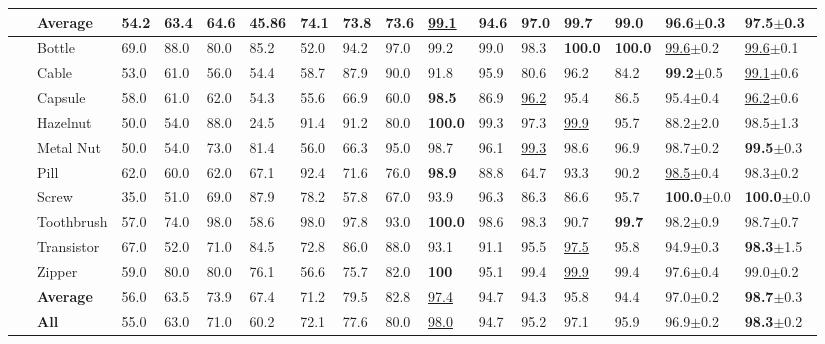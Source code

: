 \documentclass[lettersize,journal]{IEEEtran}
\begin{document}
\begin{table*}[htb]
{\begin{tabular}{C{5pt}|C{38pt}|C{23pt}C{20pt}C{21pt}C{24pt}C{24pt}C{24pt}C{23pt}C{25pt}|C{19pt}C{27pt}C{28pt}C{22pt}|C{27pt}C{28pt}}
		\hline
		~&\textbf{Average} & 54.2 & 63.4 & 64.6 & 45.86 & 74.1 & 73.8 & 73.6 & \underline{99.1} & 94.6 & 97.0 & \textbf{99.7} & 99.0 & 96.6\tiny{$\pm$0.3} & 97.5\tiny{$\pm$0.3} \\
		\hline
		&Bottle& 69.0 & 88.0 & 80.0 & 85.2 & 52.0 & 94.2 & 97.0 & 99.2 & 99.0 & 98.3 & \textbf{100.0} & \textbf{100.0} & \underline{99.6}\tiny{$\pm$0.2} & \underline{99.6}\tiny{$\pm$0.1} \\
		~&Cable& 53.0 &61.0 & 56.0 & 54.4 & 58.7 & 87.9 & 90.0 & 91.8 & 95.9 & 80.6 & 96.2 & 84.2 & \textbf{99.2}\tiny{$\pm$0.5} & \underline{99.1}\tiny{$\pm$0.6} \\
		~&Capsule& 58.0 & 61.0 & 62.0 & 54.3 & 55.6 & 66.9 & 60.0 & \textbf{98.5} & 86.9 & \underline{96.2} & 95.4 & 86.5 & 95.4\tiny{$\pm$0.4} & \underline{96.2}\tiny{$\pm$0.6} \\
		~&Hazelnut& 50.0 & 54.0 & 88.0 & 24.5 & 91.4 & 91.2 & 80.0 & \textbf{100.0} & 99.3 & 97.3 & \underline{99.9} & 95.7 & 88.2\tiny{$\pm$2.0} & 98.5\tiny{$\pm$1.3} \\
		~&Metal Nut& 50.0 & 54.0 & 73.0 & 81.4 & 56.0 & 66.3 & 95.0 & 98.7 & 96.1 & \underline{99.3} & 98.6 & 96.9 & 98.7\tiny{$\pm$0.2} & \textbf{99.5}\tiny{$\pm$0.3} \\
		~&Pill& 62.0 & 60.0 & 62.0 & 67.1 & 92.4 & 71.6 & 76.0 & \textbf{98.9} & 88.8 & 64.7 & 93.3 & 90.2 & \underline{98.5}\tiny{$\pm$0.4} & 98.3\tiny{$\pm$0.2} \\
		~&Screw& 35.0 & 51.0 & 69.0 & 87.9 & 78.2 & 57.8 & 67.0 & 93.9 & 96.3 & 86.3 & 86.6 & 95.7 & \textbf{100.0}\tiny{$\pm$0.0} & \textbf{100.0}\tiny{$\pm$0.0} \\
		~&Toothbrush& 57.0 & 74.0 & 98.0 & 58.6 & 98.0 & 97.8 & 93.0 & \textbf{100.0} & 98.6 & 98.3 & 90.7 & \textbf{99.7} & 98.2\tiny{$\pm$0.9} & 98.7\tiny{$\pm$0.7} \\
		~&Transistor& 67.0 & 52.0 & 71.0 & 84.5 & 72.8 & 86.0 & 88.0 & 93.1 & 91.1 & 95.5 & \underline{97.5} & 95.8 & 94.9\tiny{$\pm$0.3} & \textbf{98.3}\tiny{$\pm$1.5} \\
		~&Zipper& 59.0 & 80.0 & 80.0 & 76.1 & 56.6 & 75.7 & 82.0 & \textbf{100} & 95.1 & 99.4 & \underline{99.9} & 99.4 & 97.6\tiny{$\pm$0.4} & 99.0\tiny{$\pm$0.2} \\
		\hline
		~&\textbf{Average} & 56.0 & 63.5 & 73.9 & 67.4 & 71.2 & 79.5 & 82.8 & \underline{97.4} & 94.7 & 94.3 & 95.8 & 94.4 & 97.0\tiny{$\pm$0.2} & \textbf{98.7}\tiny{$\pm$0.3} \\
		\hline
		~&\textbf{All}& 55.0 & 63.0 &71.0 & 60.2 & 72.1 & 77.6 & 80.0 & \underline{98.0} & 94.7 & 95.2 & 97.1 & 95.9 & 96.9\tiny{$\pm$0.2} & \textbf{98.3}\tiny{$\pm$0.2} \\
		\hline
	\end{tabular}
	}
	\label{table:mvtec}
\end{table*}
\end{document}
